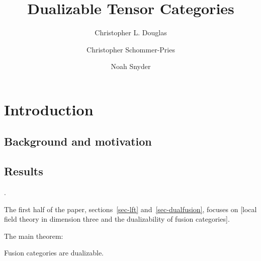 \documentclass{amsart}
\begin{document}
\title{Dualizable Tensor Categories}

\begin{abstract}

\end{abstract}
	
\author{Christopher L. Douglas}
\address{Department of Mathematics, University of California, Berkeley, CA 94720, USA}
	
\author{Christopher Schommer-Pries}
\address{Department of Mathematics \\
} %

\author{Noah Snyder}
\address{}

\maketitle	
\setcounter{tocdepth}{3}
\tableofcontents

\section{Introduction}




\subsection{Background and motivation}

\subsection{Results}.


The first half of the paper, sections~\ref{sec-lft} and~\ref{sec-dualfusion}, focuses on [local field theory in dimension three and the dualizability of fusion categories].

The main theorem:
\begin{theorem}
Fusion categories are dualizable.
\end{theorem}
\end{document}
